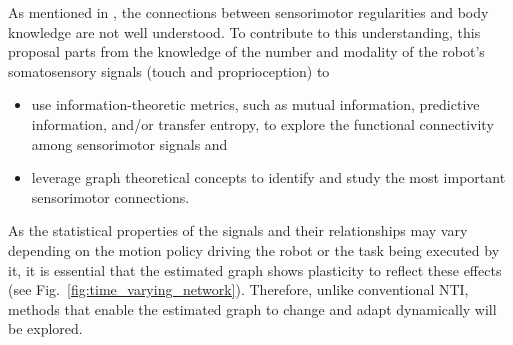 As mentioned in \cite{Jacquey2019Sensorimotorcontingenciesas}, the connections between sensorimotor regularities and body knowledge are not well understood. To contribute to this understanding, this proposal parts from the knowledge of the number and modality of the robot's somatosensory signals (touch and proprioception) to%
\begin{itemize}
	\item use information-theoretic metrics, such as mutual information, predictive information, and/or transfer entropy, to explore the functional connectivity among sensorimotor signals and
	\item leverage graph theoretical concepts to identify and study the most important sensorimotor connections.
\end{itemize}
As the statistical properties of the signals and their relationships may vary depending on the motion policy driving the robot or the task being executed by it, it is essential that the estimated graph shows plasticity to reflect these effects (see Fig.~\ref{fig:time_varying_network}). Therefore, unlike conventional NTI, methods that enable the estimated graph to change and adapt dynamically will be explored.

